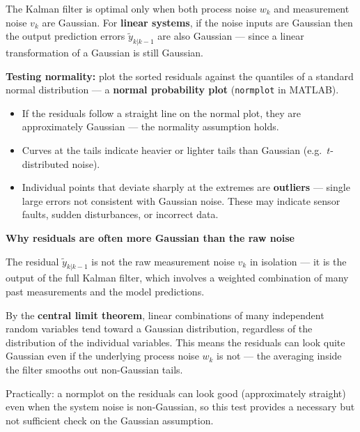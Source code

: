 \documentclass[12pt, a4paper]{article}
\begin{document}
The Kalman filter is optimal only when both process noise $w_k$ and
measurement noise $v_k$ are Gaussian.
For \textbf{linear systems}, if the noise inputs are Gaussian then the
output prediction errors $\tilde{y}_{k|k-1}$ are also Gaussian --- since
a linear transformation of a Gaussian is still Gaussian.

\textbf{Testing normality:} plot the sorted residuals against the
quantiles of a standard normal distribution --- a
\textbf{normal probability plot} (\texttt{normplot} in MATLAB).
\begin{itemize}[leftmargin=1.5em, itemsep=2pt]
  \item If the residuals follow a straight line on the normal plot, they
    are approximately Gaussian --- the normality assumption holds.
  \item Curves at the tails indicate heavier or lighter tails than
    Gaussian (e.g.\ $t$-distributed noise).
  \item Individual points that deviate sharply at the extremes are
    \textbf{outliers} --- single large errors not consistent with
    Gaussian noise.
    These may indicate sensor faults, sudden disturbances, or incorrect
    data.
\end{itemize}

\begin{notebox}
  \textbf{Why residuals are often more Gaussian than the raw noise}

  The residual $\tilde{y}_{k|k-1}$ is not the raw measurement noise $v_k$
  in isolation --- it is the output of the full Kalman filter, which
  involves a weighted combination of many past measurements and the model
  predictions.

  By the \textbf{central limit theorem}, linear combinations of many
  independent random variables tend toward a Gaussian distribution,
  regardless of the distribution of the individual variables.
  This means the residuals can look quite Gaussian even if the underlying
  process noise $w_k$ is not --- the averaging inside the filter smooths
  out non-Gaussian tails.

  Practically: a normplot on the residuals can look good (approximately
  straight) even when the system noise is non-Gaussian, so this test
  provides a necessary but not sufficient check on the Gaussian assumption.
\end{notebox}
\end{document}
